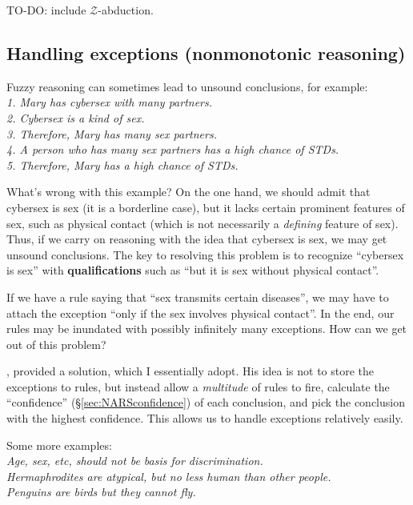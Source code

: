 TO-DO:  include $\mathcal{Z}$-abduction.

\subsection{Handling exceptions (nonmonotonic reasoning)}
\label{sec:exceptions}

Fuzzy reasoning can sometimes lead to unsound conclusions, for example:\\
\textit{1. Mary has cybersex with many partners.\\
2. Cybersex is a kind of sex.\\
3. Therefore, Mary has many sex partners.\\
4. A person who has many sex partners has a high chance of STDs.\\
5. Therefore, Mary has a high chance of STDs.}

What's wrong with this example?  On the one hand, we should admit that cybersex is sex (it is a borderline case), but it lacks certain prominent features of sex, such as physical contact (which is not necessarily a \textit{defining} feature of sex).  Thus, if we carry on reasoning with the idea that cybersex is sex, we may get unsound conclusions.  The key to resolving this problem is to recognize ``cybersex is sex'' with \textbf{qualifications} such as ``but it is sex without physical contact''.

If we have a rule saying that ``sex transmits certain diseases'', we may have to attach the exception ``only if the sex involves physical contact''.  In the end, our rules may be inundated with possibly infinitely many exceptions.  How can we get out of this problem?

\citep*{Wang1994}, \citep*{Wang2006} provided a solution, which I essentially adopt.  His idea is not to store the exceptions to rules, but instead allow a \textit{multitude} of rules to fire, calculate the ``confidence'' (\S\ref{sec:NARSconfidence}) of each conclusion, and pick the conclusion with the highest confidence.  This allows us to handle exceptions relatively easily.

Some more examples:\\
\hspace*{1cm} \textbullet \textit{ Age, sex, etc, should not be basis for discrimination.}\\
\hspace*{1cm} \textbullet \textit{ Hermaphrodites are atypical, but no less human than other people.}\\
\hspace*{1cm} \textbullet \textit{ Penguins are birds but they cannot fly.}

